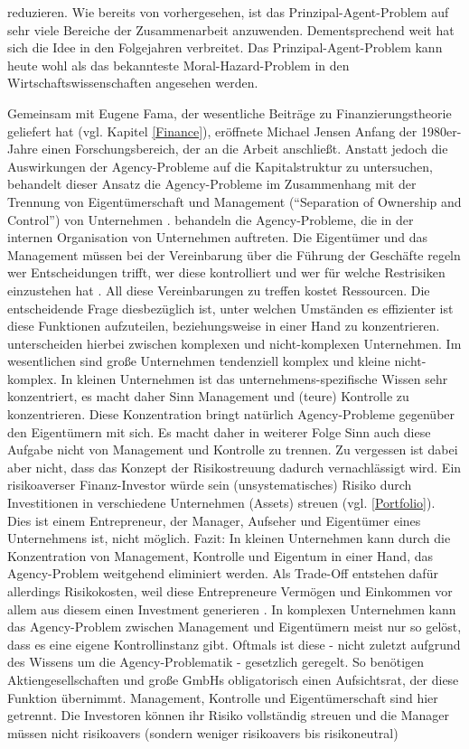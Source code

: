 reduzieren. Wie bereits von \textcite[S. 311]{Jensen1976} vorhergesehen, ist das Prinzipal-Agent-Problem auf sehr viele Bereiche der Zusammenarbeit anzuwenden. Dementsprechend weit hat sich die Idee in den Folgejahren verbreitet. Das Prinzipal-Agent-Problem kann heute wohl als das bekannteste Moral-Hazard-Problem in den Wirtschaftswissenschaften angesehen werden.

Gemeinsam mit Eugene Fama, der wesentliche Beiträge zu Finanzierungstheorie geliefert hat (vgl. Kapitel \ref{Finance}), eröffnete Michael Jensen Anfang der 1980er-Jahre einen Forschungsbereich, der an die Arbeit \textcite{Jensen1976} anschließt. Anstatt jedoch die Auswirkungen der Agency-Probleme auf die Kapitalstruktur zu untersuchen, behandelt dieser Ansatz die Agency-Probleme im Zusammenhang mit der Trennung von Eigentümerschaft und Management ("`Separation of Ownership and Control"') von Unternehmen \parencite[S. 86]{Erlei2016}. \textcite{Fama1983a} behandeln die Agency-Probleme, die in der internen Organisation von Unternehmen auftreten. Die Eigentümer und das Management müssen bei der Vereinbarung über die Führung der Geschäfte regeln wer Entscheidungen trifft, wer diese kontrolliert und wer für welche Restrisiken einzustehen hat \parencite[S. 304]{Fama1983a}. All diese Vereinbarungen zu treffen kostet Ressourcen. Die entscheidende Frage diesbezüglich ist, unter welchen Umständen es effizienter ist diese Funktionen aufzuteilen, beziehungsweise in einer Hand zu konzentrieren. \textcite{Fama1983a} unterscheiden hierbei zwischen komplexen und nicht-komplexen Unternehmen. Im wesentlichen sind große Unternehmen tendenziell komplex und kleine nicht-komplex. In kleinen Unternehmen ist das unternehmens-spezifische Wissen sehr konzentriert, es macht daher Sinn Management und (teure) Kontrolle zu konzentrieren. Diese Konzentration bringt natürlich Agency-Probleme gegenüber den Eigentümern mit sich. Es macht daher in weiterer Folge Sinn auch diese Aufgabe nicht von Management und Kontrolle zu trennen. Zu vergessen ist dabei aber nicht, dass das Konzept der Risikostreuung dadurch vernachlässigt wird. Ein risikoaverser Finanz-Investor würde sein (unsystematisches) Risiko durch Investitionen in verschiedene Unternehmen (Assets) streuen (vgl. \ref{Portfolio}). Dies ist einem Entrepreneur, der Manager, Aufseher und Eigentümer eines Unternehmens ist, nicht möglich. Fazit: In kleinen Unternehmen kann durch die Konzentration von Management, Kontrolle und Eigentum in einer Hand, das Agency-Problem weitgehend eliminiert werden. Als Trade-Off entstehen dafür allerdings Risikokosten, weil diese Entrepreneure Vermögen und Einkommen vor allem aus diesem einen Investment generieren \parencite[S. 306]{Fama1983a}. In komplexen Unternehmen kann das Agency-Problem zwischen Management und Eigentümern meist nur so gelöst, dass es eine eigene Kontrollinstanz gibt. Oftmals ist diese - nicht zuletzt aufgrund des Wissens um die Agency-Problematik - gesetzlich geregelt. So benötigen Aktiengesellschaften und große GmbHs obligatorisch einen Aufsichtsrat, der diese Funktion übernimmt. Management, Kontrolle und Eigentümerschaft sind hier getrennt. Die Investoren können ihr Risiko vollständig streuen und die Manager müssen nicht risikoavers (sondern weniger risikoavers bis risikoneutral) 